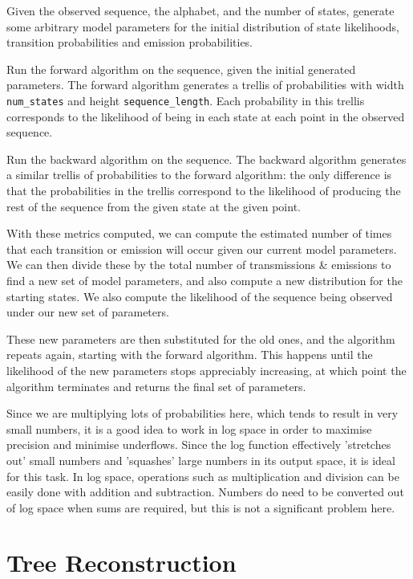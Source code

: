 \documentclass[11pt]{article} %
\begin{document}
Given the observed sequence, the alphabet, and the number of states, generate some arbitrary model parameters for the initial distribution of state likelihoods, transition probabilities and emission probabilities.

Run the forward algorithm on the sequence, given the initial generated parameters. The forward algorithm generates a trellis of probabilities with width \texttt{num\_states} and height \texttt{sequence\_length}. Each probability in this trellis corresponds to the likelihood of being in each state at each point in the observed sequence.

Run the backward algorithm on the sequence. The backward algorithm generates a similar trellis of probabilities to the forward algorithm: the only difference is that the probabilities in the trellis correspond to the likelihood of producing the rest of the sequence from the given state at the given point.

With these metrics computed, we can compute the estimated number of times that each transition or emission will occur given our current model parameters. We can then divide these by the total number of transmissions \& emissions to find a new set of model parameters, and also compute a new distribution for the starting states. We also compute the likelihood of the sequence being observed under our new set of parameters.

These new parameters are then substituted for the old ones, and the algorithm repeats again, starting with the forward algorithm. This happens until the likelihood of the new parameters stops appreciably increasing, at which point the algorithm terminates and returns the final set of parameters.

Since we are multiplying lots of probabilities here, which tends to result in very small numbers, it is a good idea to work in log space in order to maximise precision and minimise underflows. Since the log function effectively 'stretches out' small numbers and 'squashes' large numbers in its output space, it is ideal for this task. In log space, operations such as multiplication and division can be easily done with addition and subtraction. Numbers do need to be converted out of log space when sums are required, but this is not a significant problem here.


\hfill

\hfill


\section{Tree Reconstruction}
\end{document}
